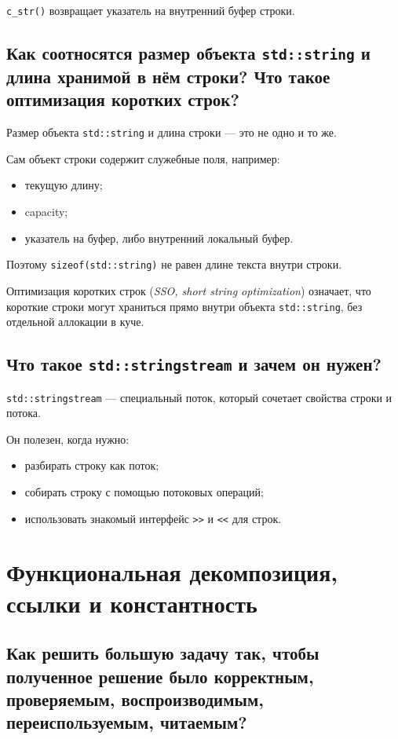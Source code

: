 \texttt{c\_str()} возвращает указатель на внутренний буфер строки.


\subsection{Как соотносятся размер объекта \texttt{std::string} и длина хранимой в нём строки? Что такое оптимизация коротких строк?}

Размер объекта \texttt{std::string} и длина строки --- это не одно и то же.

Сам объект строки содержит служебные поля, например:
\begin{itemize}
    \item текущую длину;
    \item capacity;
    \item указатель на буфер, либо внутренний локальный буфер.
\end{itemize}

Поэтому \texttt{sizeof(std::string)} не равен длине текста внутри строки.

Оптимизация коротких строк (\textit{SSO, short string optimization}) означает, что короткие строки могут храниться прямо внутри объекта \texttt{std::string}, без отдельной аллокации в куче.


\subsection{Что такое \texttt{std::stringstream} и зачем он нужен?}

\texttt{std::stringstream} --- специальный поток, который сочетает свойства строки и потока.

Он полезен, когда нужно:
\begin{itemize}
    \item разбирать строку как поток;
    \item собирать строку с помощью потоковых операций;
    \item использовать знакомый интерфейс \texttt{>>} и \texttt{<<} для строк.
\end{itemize}



\section{Функциональная декомпозиция, ссылки и константность}

\subsection{Как решить большую задачу так, чтобы полученное решение было корректным, проверяемым, воспроизводимым, переиспользуемым, читаемым?}

